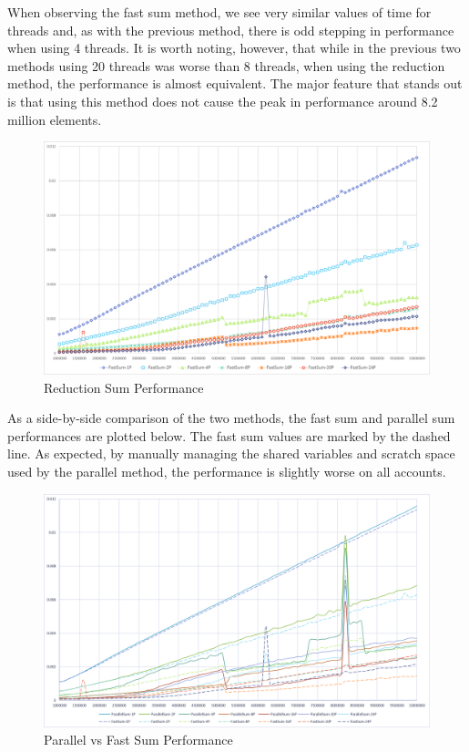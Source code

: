 \documentclass[a4paper, 11pt]{article}
\begin{document}
When observing the fast sum method, we see very similar values of time for threads and, as with the previous method, there is odd stepping in performance when using 4 threads. It is worth noting, however, that while in the previous two methods using 20 threads was worse than 8 threads, when using the reduction method, the performance is almost equivalent. The major feature that stands out is that using this method does not cause the peak in performance around 8.2 million elements.
\begin{figure}[H]
	\centering
	\includegraphics[width=\textwidth]{fast_sum.png}
	\caption{Reduction Sum Performance}
\end{figure}

As a side-by-side comparison of the two methods, the fast sum and parallel sum performances are plotted below. The fast sum values are marked by the dashed line. As expected, by manually managing the shared variables and scratch space used by the parallel method, the performance is slightly worse on all accounts.
\begin{figure}[H]
	\centering
	\includegraphics[width=\textwidth]{parallel_vs_fast.png}
	\caption{Parallel vs Fast Sum Performance}
\end{figure}
\end{document}
